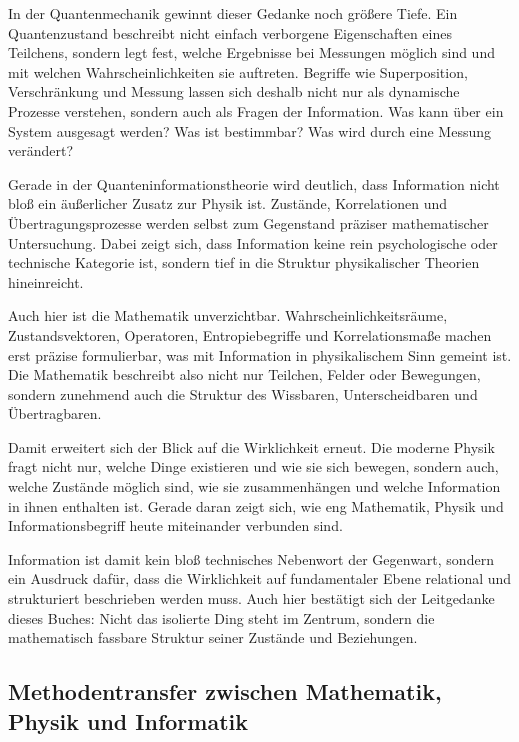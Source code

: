 In der Quantenmechanik gewinnt dieser Gedanke noch größere Tiefe. Ein Quantenzustand beschreibt nicht einfach verborgene Eigenschaften eines Teilchens, sondern legt fest, welche Ergebnisse bei Messungen möglich sind und mit welchen Wahrscheinlichkeiten sie auftreten. Begriffe wie Superposition, Verschränkung und Messung lassen sich deshalb nicht nur als dynamische Prozesse verstehen, sondern auch als Fragen der Information. Was kann über ein System ausgesagt werden? Was ist bestimmbar? Was wird durch eine Messung verändert?

Gerade in der Quanteninformationstheorie wird deutlich, dass Information nicht bloß ein äußerlicher Zusatz zur Physik ist. Zustände, Korrelationen und Übertragungsprozesse werden selbst zum Gegenstand präziser mathematischer Untersuchung. Dabei zeigt sich, dass Information keine rein psychologische oder technische Kategorie ist, sondern tief in die Struktur physikalischer Theorien hineinreicht.

Auch hier ist die Mathematik unverzichtbar. Wahrscheinlichkeitsräume, Zustandsvektoren, Operatoren, Entropiebegriffe und Korrelationsmaße machen erst präzise formulierbar, was mit Information in physikalischem Sinn gemeint ist. Die Mathematik beschreibt also nicht nur Teilchen, Felder oder Bewegungen, sondern zunehmend auch die Struktur des Wissbaren, Unterscheidbaren und Übertragbaren.

Damit erweitert sich der Blick auf die Wirklichkeit erneut. Die moderne Physik fragt nicht nur, welche Dinge existieren und wie sie sich bewegen, sondern auch, welche Zustände möglich sind, wie sie zusammenhängen und welche Information in ihnen enthalten ist. Gerade daran zeigt sich, wie eng Mathematik, Physik und Informationsbegriff heute miteinander verbunden sind.

Information ist damit kein bloß technisches Nebenwort der Gegenwart, sondern ein Ausdruck dafür, dass die Wirklichkeit auf fundamentaler Ebene relational und strukturiert beschrieben werden muss. Auch hier bestätigt sich der Leitgedanke dieses Buches: Nicht das isolierte Ding steht im Zentrum, sondern die mathematisch fassbare Struktur seiner Zustände und Beziehungen.


\subsection{Methodentransfer zwischen Mathematik, Physik und Informatik}

